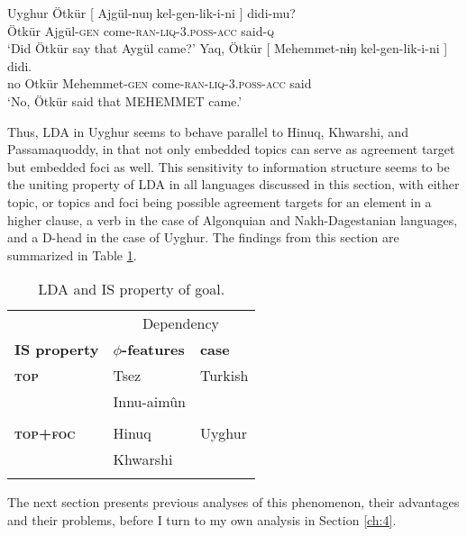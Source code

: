 \documentclass[output=paper
,modfonts
,nonflat]{langsci/langscibook}
\begin{document}
\begin{exe}
\ex Uyghur \citep[][10]{Asarina_Hartman2011a}
	\xlist
		\gll Ötkür [ Ajgül-nuŋ kel-gen-lik-i-ni ] didi-mu?\\
			 Ötkür {} Ajgül-\textsc{gen} come-\textsc{ran-liq-3.poss-acc} {} said-\textsc{q}\\
		\glt `Did Ötkür say that Aygül came?'
	 \label{ex:uyg_cf}
		\gll Yaq, Ötkür [ Mehemmet-nɨŋ kel-gen-lik-i-ni ] didi.\\
			 no Otkür {} Mehemmet-\textsc{gen} come-\textsc{ran-liq-3.poss-acc} {} said\\
		\glt `No, Ötkür said that MEHEMMET came.'
	\endxlist
\end{exe}
Thus, LDA in Uyghur seems to behave parallel to Hinuq, Khwarshi, and Passamaquoddy, in that not only embedded topics can serve as agreement target but embedded foci as well. This sensitivity to information structure seems to be the uniting property of LDA in all languages discussed in this section, with either topic, or topics and foci being possible agreement targets for an element in a higher clause, a verb in the case of Algonquian and Nakh-Dagestanian languages, and a D-head in the case of Uyghur. The findings from this section are summarized in Table \ref{table:LDA}.
\begin{table}
	\caption{LDA and IS property of goal.}
	\label{table:LDA}
	\begin{tabular}{lll} 
		\lsptoprule
			& \multicolumn{2}{c}{Dependency} \\
		\cmidrule(r){2-3}
		\textbf{IS property}    & \textbf{$ \phi $-features} & \textbf{case}\\
		\midrule
		\textbf{\textsc{top}}      & Tsez \citep{Polinsky_Potsdam2001} & Turkish \citep{Sener2008} \\
			& Innu-aim\^{u}n  & \\
			& \citep{Branigan_MacKenzie2002} & \\
		\textbf{\textsc{top+foc}} & Hinuq \citep{Forker2012}     & Uyghur \\
			& Khwarshi \citep{Khalilova2009}   & \citep{Asarina_Hartman2011a}\\
		\lspbottomrule
	\end{tabular}
\end{table}

{\noindent}The next section presents previous analyses of this phenomenon, their advantages and their problems, before I turn to my own analysis in Section \ref{ch:4}.
\end{document}
